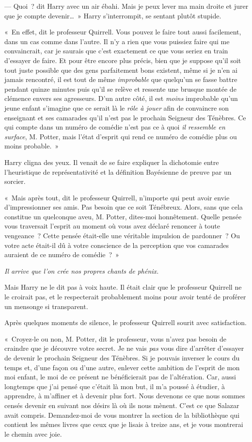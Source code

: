 --- Quoi~? dit Harry avec un air ébahi. Mais je peux lever ma main droite et jurer que je compte devenir…~» Harry s'interrompit, se sentant plutôt stupide.

«~En effet, dit le professeur Quirrell. Vous pouvez le faire tout aussi facilement, dans un cas comme dans l'autre. Il n'y a rien que vous puissiez faire qui me convaincrait, car je saurais que c'est exactement ce que vous seriez en train d'essayer de faire. Et pour être encore plus précis, bien que je suppose qu'il soit tout juste possible que des gens parfaitement bons existent, même si je n'en ai jamais rencontré, il est tout de même \emph{improbable} que quelqu'un se fasse battre pendant quinze minutes puis qu'il se relève et ressente une brusque montée de clémence envers ses agresseurs. D'un autre côté, il est \emph{moins} improbable qu'un jeune enfant s'imagine que ce serait là le \emph{rôle à jouer} afin de convaincre son enseignant et ses camarades qu'il n'est pas le prochain Seigneur des Ténèbres. Ce qui compte dans un numéro de comédie n'est pas ce à quoi \emph{il ressemble en surface}, M. Potter, mais l'état d'esprit qui rend ce numéro de comédie plus ou moins probable.~»

Harry cligna des yeux. Il venait de se faire expliquer la dichotomie entre l'heuristique de représentativité et la définition Bayésienne de preuve par un sorcier.

«~Mais après tout, dit le professeur Quirrell, n'importe qui peut avoir envie d'impressionner ses amis. Pas besoin que ce soit Ténébreux. Alors, sans que cela constitue un quelconque aveu, M. Potter, dites-moi honnêtement. Quelle pensée vous traversait l'esprit au moment où vous avez déclaré renoncer à toute vengeance~? Cette pensée était-elle une véritable impulsion de pardonner~? Ou votre acte était-il dû à votre conscience de la perception que vos camarades auraient de ce numéro de comédie~?~»

\emph{Il arrive que l'on crée nos propres chants de phénix.}

Mais Harry ne le dit pas à voix haute. Il était clair que le professeur Quirrell ne le croirait pas, et le respecterait probablement moins pour avoir tenté de proférer un mensonge si transparent.

Après quelques moments de silence, le professeur Quirrell sourit avec satisfaction.

«~Croyez-le ou non, M. Potter, dit le professeur, vous n'avez pas besoin de craindre que je découvre votre secret. Je ne vais \emph{pas} vous dire d'arrêter d'essayer de devenir le prochain Seigneur des Ténèbres. Si je pouvais inverser le cours du temps et, d'une façon ou d'une autre, enlever cette ambition de l'esprit de mon moi enfant, le moi de ce présent ne bénéficierait pas de l'altération. Car, aussi longtemps que j'ai pensé que c'était là mon but, il m'a poussé à étudier, à apprendre, à m'affiner et à devenir plus fort. Nous devenons ce que nous sommes censés devenir en suivant nos désirs là où ils nous mènent. C'est ce que Salazar avait compris. Demandez-moi de vous montrer la section de la bibliothèque qui contient les mêmes livres que ceux que je lisais à treize ans, et je vous montrerai le chemin avec joie.

